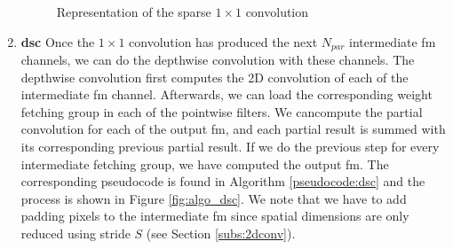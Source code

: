 \begin{enumerate}
\begin{figure}
        \caption{Representation of the sparse $1 \times 1$ convolution}
        \label{fig:algo_11conv}
    \end{figure}
    \item \textbf{\acrshort{dsc}} Once the $1 \times 1$ convolution has produced the next $N_{par}$ intermediate \acrshort{fm} channels, we can do the depthwise convolution with these channels. The depthwise convolution first computes the 2D convolution of each of the intermediate \acrshort{fm} channel. Afterwards, we can load the corresponding weight fetching group in each of the pointwise filters. We cancompute the partial convolution for each of the output \acrshort{fm}, and each partial result is summed with its corresponding previous partial result. If we do the previous step for every intermediate fetching group, we have computed the output \acrshort{fm}. The corresponding pseudocode is found in Algorithm \ref{pseudocode:dsc} and the process is shown in Figure \ref{fig:algo_dsc}. We note that we have to add padding pixels to the intermediate \acrshort{fm} since spatial dimensions are only reduced using stride $S$ (see Section \ref{subs:2dconv}).
    \begin{algorithm}
        \centering
        \begin{algorithmic}
             
                 
                     
                         
                             
                                     
                            \EndFor
                        \EndFor
                    \EndFor
                     
                         

\end{algorithmic}
\end{algorithm}
\end{enumerate}
